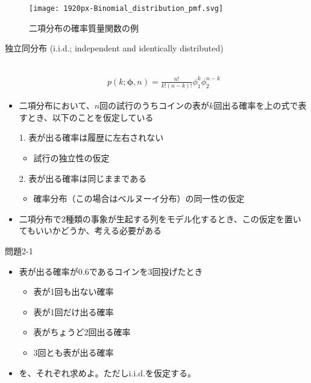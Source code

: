 \documentclass[aspectratio=169,unicode,dvipdfmx,14pt]{beamer}
\begin{document}
\begin{frame}
\begin{figure}[htbp]
\begin{center}
\vspace{.2in}
\texttt{[image: 1920px-Binomial\_distribution\_pmf.svg]}
\caption{二項分布の確率質量関数の例}
\label{}
\end{center}
\end{figure}
\end{frame}


\begin{frame}{独立同分布 {\normalsize (i.i.d.; independent and identically distributed)}}
\begin{itemize}
\item[] \
\vspace{-.3in}
\begin{align}
p(k;\bm{\phi},n)=\frac{n!}{k!(n-k)!}\phi_1^k\phi_2^{n-k}
\end{align}
\item 二項分布において、$n$回の試行のうちコインの表が$k$回出る確率を上の式で表すとき、以下のことを仮定している
\item[1.] 表が出る確率は履歴に左右されない
\begin{itemize}
\item 試行の独立性の仮定
\end{itemize}
\item[2.] 表が出る確率は同じままである
\begin{itemize}
\item 確率分布（この場合はベルヌーイ分布）の同一性の仮定
\end{itemize}
\item 二項分布で2種類の事象が生起する列をモデル化するとき、この仮定を置いてもいいかどうか、考える必要がある
\end{itemize}
\end{frame}

\begin{frame}{問題2-1}
\begin{itemize}
\item 表が出る確率が0.6であるコインを3回投げたとき
\begin{itemize}
\item 表が1回も出ない確率
\item 表が1回だけ出る確率
\item 表がちょうど2回出る確率
\item 3回とも表が出る確率
\end{itemize}
\item を、それぞれ求めよ。ただしi.i.d.を仮定する。
\end{itemize}
\end{frame}
\end{document}
